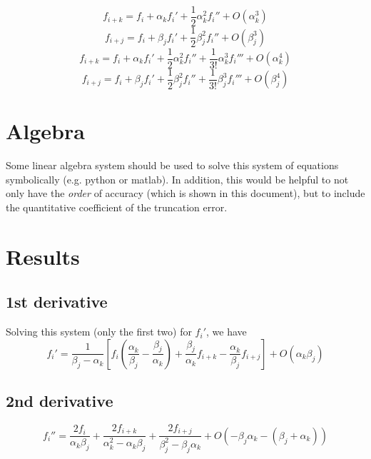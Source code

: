 \documentclass[11pt]{article}
\begin{document}
\begin{equation}
	f_{i+k} = f_{i} + \alpha_k f_i' + \frac{1}{2}\alpha_k^2 f_i'' + O(\alpha_k^3)
\end{equation}
\begin{equation}
	f_{i+j} = f_{i} + \beta_j f_i' + \frac{1}{2}\beta_j^2 f_i'' + O(\beta_j^3)
\end{equation}
\begin{equation}
	f_{i+k} = f_{i} + \alpha_k f_i' + \frac{1}{2}\alpha_k^2 f_i'' + \frac{1}{3!}\alpha_k^3 f_i''' + O(\alpha_k^4)
\end{equation}
\begin{equation}
	f_{i+j} = f_{i} + \beta_j f_i' + \frac{1}{2}\beta_j^2 f_i'' + \frac{1}{3!}\beta_j^3 f_i''' + O(\beta_j^4)
\end{equation}

\section{Algebra}
Some linear algebra system should be used to solve this system of equations symbolically (e.g. python or matlab). In addition, this would be helpful to not only have the \textit{order} of accuracy (which is shown in this document), but to include the quantitative coefficient of the truncation error.

\section{Results}
\subsection{1st derivative}
Solving this system (only the first two) for $f_i'$, we have
\begin{equation}
	\boxed{
	f_i' = 
	\frac{1}{\beta_j - \alpha_k}
	\left[
	f_i \left( \frac{\alpha_k}{\beta_j} - \frac{\beta_j}{\alpha_k}\right)
	+ \frac{\beta_j}{\alpha_k} f_{i+k}
	- \frac{\alpha_k}{\beta_j} f_{i+j}
	\right]
	+ O(\alpha_k \beta_j)
	}
\end{equation}

\subsection{2nd derivative}

\begin{equation}
	\boxed{
	f_i'' = 
	\frac{2f_i}{\alpha_k \beta_j}
	+
	\frac{2f_{i+k}}{\alpha_k^2-\alpha_k \beta_j}
	+
	\frac{2f_{i+j}}{\beta_j^2 - \beta_j \alpha_k}
	+ O(-\beta_j \alpha_k - (\beta_j+\alpha_k))
	}
\end{equation}
\end{document}
